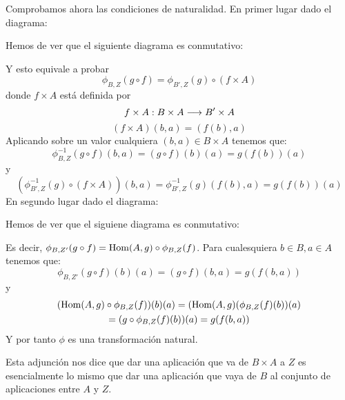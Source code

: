 Comprobamos ahora las condiciones de naturalidad. En primer lugar dado
el diagrama:
\begin{center}
\end{center}
Hemos de ver que el siguiente diagrama es conmutativo:
\begin{center}
\end{center}
Y esto equivale a probar
$$\phi_{B,  Z}(g \circ f) = \phi_{B', Z}(g) \circ (f\times A)$$
donde $f \times A$ está definida por
$$f\times A: B\times A\longrightarrow B'\times A$$
$$(f\times A)(b, a) = (f(b), a)$$
Aplicando sobre un valor cualquiera
$(b, a) \in B\times A$ tenemos que:
$$\phi_{B, Z}^{-1}(g \circ f)(b, a) = (g\circ f)(b)(a) = g(f(b))(a)$$
y
$$(\phi_{B', Z}^{-1}(g) \circ (f\times A))(b, a) =
   \phi_{B', Z}^{-1}(g)(f(b), a) = g(f(b))(a)$$
En segundo lugar dado el diagrama:
\begin{center}
\end{center}
Hemos de ver que el siguiene diagrama es conmutativo:
\begin{center}
\end{center}
Es decir, $\phi_{B, Z'}(g \circ f) = \operatorname{Hom}(A, g) \circ \phi_{B, Z}(f)$. Para
cualesquiera
$b \in B, a \in A$ tenemos que:
$$\phi_{B, Z'}(g \circ f)(b)(a) = (g\circ f)(b, a) = g(f(b, a))$$
y
\begin{multline*}
(\operatorname{Hom}(A, g)\circ\phi_{B, Z}(f))(b)(a) = (\operatorname{Hom}(A, g)(\phi_{B, Z}(f)(b))(a)\\
  = (g \circ \phi_{B,Z}(f)(b))(a) = g(f(b, a))
\end{multline*}
Y por tanto $\phi$ es una transformación natural.

Esta adjunción nos dice que dar una aplicación que va de $B\times A$ a $Z$
es esencialmente lo mismo que dar una aplicación que vaya de $B$ al conjunto
de aplicaciones entre $A$ y $Z$.
